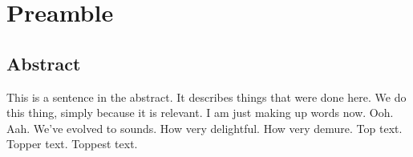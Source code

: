 
\setcounter{chapter}{-1}

\chapter{Preamble}

\section*{Abstract}

This is a sentence in the abstract. It describes things that were done here. We do this thing, simply because it is relevant. I am just making up words now. Ooh. Aah. We've evolved to sounds. How very delightful. How very demure. Top text. Topper text. Toppest text.

